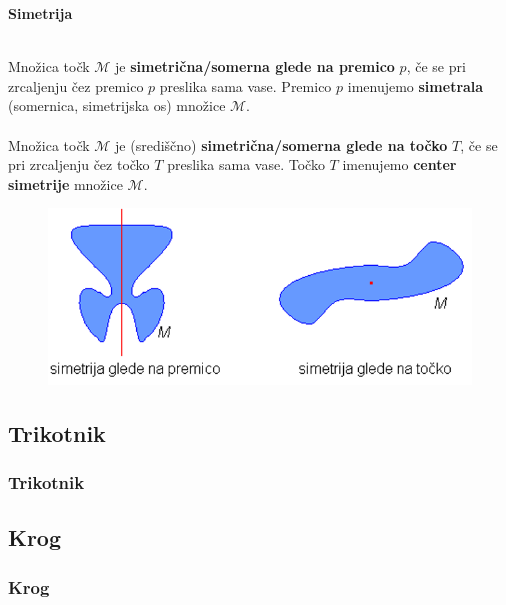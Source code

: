         \begin{frame}
            \large\textbf{Simetrija}
            ~\\
            ~\\
            \normalsize

            Množica točk $\mathcal{M}$ je \textbf{simetrična/somerna glede na premico} $p$, če se pri zrcaljenju čez premico $p$ preslika sama vase. Premico $p$ imenujemo \textbf{simetrala} (somernica, simetrijska os) množice $\mathcal{M}$. \\
            ~\\
            
            Množica točk $\mathcal{M}$ je (središčno) \textbf{simetrična/somerna glede na točko} $T$, če se pri zrcaljenju čez točko $T$ preslika sama vase. Točko $T$ imenujemo \textbf{center simetrije} množice $\mathcal{M}$. 
            \begin{figure}
                \includegraphics[scale=0.45]{Slike in skice/Simetrija.png}
            \end{figure}

        \end{frame}

    \subsection{Trikotnik}

        \begin{frame}
            \frametitle{Trikotnik}


        \end{frame}

    \subsection{Krog}

        \begin{frame}
            \frametitle{Krog}
        \end{frame}

